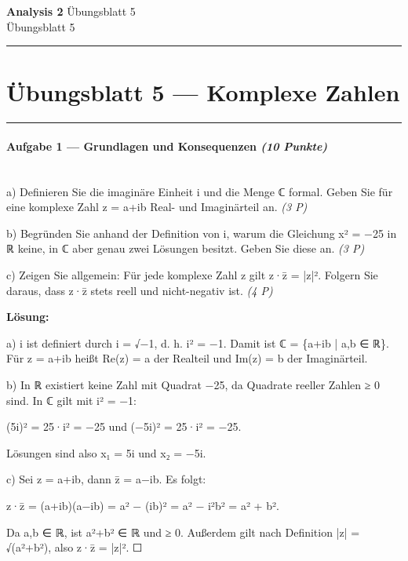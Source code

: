 \documentclass[11pt, a4paper]{article}
\providecommand{\nichttitle}{Übungsblatt}
\providecommand{\nichtsubtitle}{}
\renewcommand{\nichttitle}{Analysis 2}
\renewcommand{\nichtsubtitle}{Übungsblatt 5}
\begin{document}
\begin{center}
{\Large\bfseries\color{accent}\nichttitle}
\ifx\nichtsubtitle\empty\else
  \\[2pt]{\normalsize\color{accent!80!black}\nichtsubtitle}
\fi
\\[2pt]
\color{accent}\rule{0.4\linewidth}{0.8pt}\color{black}
\end{center}
\vspace{4pt}


\section{Übungsblatt 5 — Komplexe Zahlen}


\noindent\textcolor{rulegray}{\rule{\linewidth}{0.4pt}}


\paragraph{Aufgabe 1 — Grundlagen und Konsequenzen \textit{(10 Punkte)}}\mbox{}\\[2pt]

a) Definieren Sie die imaginäre Einheit i und die Menge ℂ formal. Geben Sie für eine komplexe Zahl z = a+ib Real- und Imaginärteil an. \textit{(3 P)}


b) Begründen Sie anhand der Definition von i, warum die Gleichung x² = −25 in ℝ keine, in ℂ aber genau zwei Lösungen besitzt. Geben Sie diese an. \textit{(3 P)}


c) Zeigen Sie allgemein: Für jede komplexe Zahl z gilt z·z̄ = |z|². Folgern Sie daraus, dass z·z̄ stets reell und nicht-negativ ist. \textit{(4 P)}


\textbf{Lösung:}


a) i ist definiert durch i = √−1, d. h. i² = −1. Damit ist ℂ = \{a+ib | a,b ∈ ℝ\}. Für z = a+ib heißt Re(z) = a der Realteil und Im(z) = b der Imaginärteil.


b) In ℝ existiert keine Zahl mit Quadrat −25, da Quadrate reeller Zahlen ≥ 0 sind. In ℂ gilt mit i² = −1:

(5i)² = 25·i² = −25 und (−5i)² = 25·i² = −25.

Lösungen sind also x₁ = 5i und x₂ = −5i.


c) Sei z = a+ib, dann z̄ = a−ib. Es folgt:

z·z̄ = (a+ib)(a−ib) = a² − (ib)² = a² − i²b² = a² + b².

Da a,b ∈ ℝ, ist a²+b² ∈ ℝ und ≥ 0. Außerdem gilt nach Definition |z| = √(a²+b²), also z·z̄ = |z|². ☐
\end{document}
